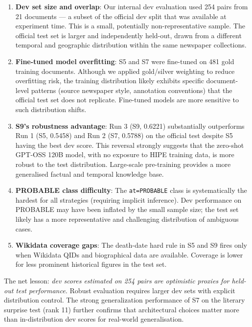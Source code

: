 \documentclass{ceurart}
\begin{document}
\begin{enumerate}
  \item \textbf{Dev set size and overlap}: Our internal dev evaluation used 254 pairs from 21 documents --- a subset of the official dev split that was available at experiment time. This is a small, potentially non-representative sample. The official test set is larger and independently held-out, drawn from a different temporal and geographic distribution within the same newspaper collections.

  \item \textbf{Fine-tuned model overfitting}: S5 and S7 were fine-tuned on 481 gold training documents. Although we applied gold/silver weighting to reduce overfitting risk, the training distribution likely exhibits specific document-level patterns (source newspaper style, annotation conventions) that the official test set does not replicate. Fine-tuned models are more sensitive to such distribution shifts.

  \item \textbf{S9's robustness advantage}: Run 3 (S9, 0.6221) substantially outperforms Run 1 (S5, 0.5458) and Run 2 (S7, 0.5788) on the official test despite S5 having the best dev score. This reversal strongly suggests that the zero-shot GPT-OSS 120B model, with no exposure to HIPE training data, is more robust to the test distribution. Large-scale pre-training provides a more generalised factual and temporal knowledge base.

  \item \textbf{PROBABLE class difficulty}: The \texttt{at=PROBABLE} class is systematically the hardest for all strategies (requiring implicit inference). Dev performance on PROBABLE may have been inflated by the small sample size; the test set likely has a more representative and challenging distribution of ambiguous cases.

  \item \textbf{Wikidata coverage gaps}: The death-date hard rule in S5 and S9 fires only when Wikidata QIDs and biographical data are available. Coverage is lower for less prominent historical figures in the test set.
\end{enumerate}

The net lesson: \emph{dev scores estimated on 254 pairs are optimistic proxies for held-out test performance.} Robust evaluation requires larger dev sets with explicit distribution control. The strong generalization performance of S7 on the literary surprise test (rank 11) further confirms that architectural choices matter more than in-distribution dev scores for real-world generalisation.
\end{document}
